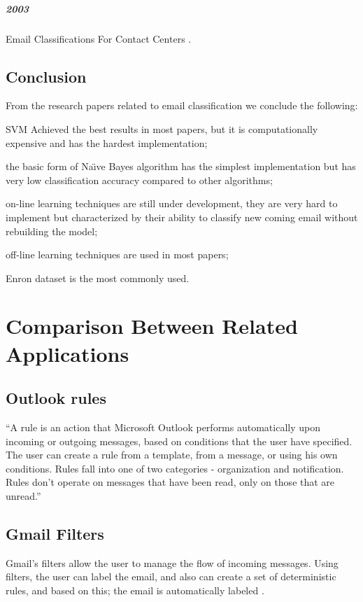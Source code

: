 \subparagraph{2003}
\begin{my_itemize}
  \item Email Classifications For Contact Centers \cite{ANI03}.
\end{my_itemize}


\subsection{Conclusion}
From the research papers related to email classification we conclude the following:
\begin{my_itemize}
    \item SVM Achieved the best results in most papers, but it is computationally 
    expensive and has the hardest implementation;
    \item the basic form of Na\"{\i}ve Bayes algorithm has the simplest implementation 
    but has very low classification accuracy compared to other algorithms;
    \item on-line learning techniques are still under development, they are very 
    hard to implement but characterized by their ability to classify new coming 
    email without rebuilding the model;
    \item off-line learning techniques are used in most papers;
    \item Enron dataset \cite{ENRON} is the most commonly used.
\end{my_itemize}
\section{Comparison Between Related Applications}
\label{sec:related_apps}

\subsection{Outlook rules}
``A rule is an action that Microsoft Outlook performs automatically upon incoming or outgoing 
messages, based on conditions that the user have specified. The user can create a rule 
from a template, from a message, or using his own conditions. Rules fall into one of 
two categories - organization and notification. Rules don't operate on messages that 
have been read, only on those that are unread.'' \cite{OUTLOOK_REF}

\subsection{Gmail Filters}
Gmail's filters allow the user to manage the flow of incoming messages. Using filters, 
the user can label the email, and also can create a set of deterministic rules, and 
based on this; the email is automatically labeled \cite{GMAIL_FILTERS}.

